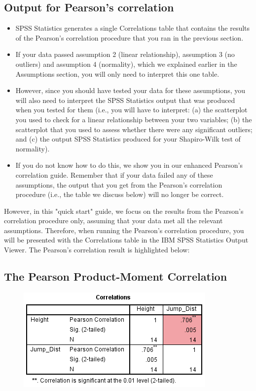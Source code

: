 \documentclass[]{article}
\begin{document}
\subsection{Output for Pearson's correlation}
\begin{itemize}
	\item SPSS Statistics generates a single Correlations table that contains the results of the Pearson’s correlation procedure that you ran in the previous section.
	\item If your data passed assumption 2 (linear relationship), assumption 3 (no outliers) and assumption 4 (normality), which we explained earlier in the Assumptions section, you will only need to interpret this one table. 
	\item However, since you should have tested your data for these assumptions, you will also need to interpret the SPSS Statistics output that was produced when you tested for them (i.e., you will have to interpret: (a) the scatterplot you used to check for a linear relationship between your two variables; (b) the scatterplot that you used to assess whether there were any significant outliers; and (c) the output SPSS Statistics produced for your Shapiro-Wilk test of normality). 
	\item If you do not know how to do this, we show you in our enhanced Pearson’s correlation guide. Remember that if your data failed any of these assumptions, the output that you get from the Pearson’s correlation procedure (i.e., the table we discuss below) will no longer be correct.
	
\end{itemize}

However, in this "quick start" guide, we focus on the results from the Pearson’s correlation procedure only, assuming that your data met all the relevant assumptions. Therefore, when running the Pearson’s correlation procedure, you will be presented with the Correlations table in the IBM SPSS Statistics Output Viewer. The Pearson's correlation result is highlighted below:

\subsection{The Pearson Product-Moment Correlation}
\begin{figure}
\centering
\includegraphics[width=0.7\linewidth]{images/pearsons-correlation-result-highlighted}
\caption{}
\label{fig:pearsons-correlation-result-highlighted}
\end{figure}
\end{document}
